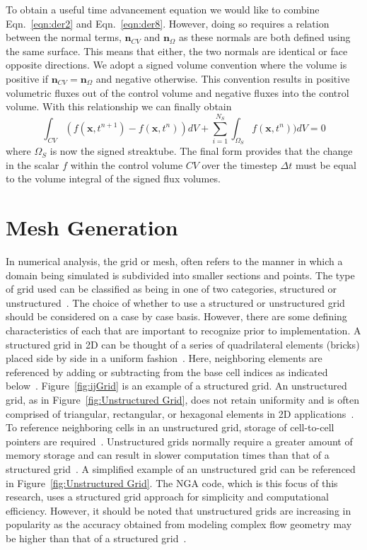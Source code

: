 To obtain a useful time advancement equation we would like to combine Eqn.~\ref{eqn:der2} and Eqn.~\ref{eqn:der8}. However, doing so requires a relation between the normal terms, $\bm{n}_{CV}$ and $\bm{n}_{\Omega}$ as these normals are both defined using the same surface. This means that either, the two normals are identical or face opposite directions. We adopt a signed volume convention where the volume is positive if $\bm{n}_{CV} = \bm{n}_{\Omega}$ and negative otherwise. This convention results in positive volumetric fluxes out of the control volume and negative fluxes into the control volume. With this relationship we can finally obtain 
\begin{equation}
\int_{CV} (f (\bm{x} , t^{n+1}) - f (\bm{x} , t^{n}) )dV + \sum_{i=1}^{N_S}\int_{\Omega_S} f (\bm{x} , t^{n}) )dV =0
\label{eqn:derFinal}
\end{equation}
where $\Omega_S$ is now the signed streaktube. The final form provides that the change in the scalar $f$  within the control volume $CV$ over the timestep $\Delta t$ must be equal to the volume integral of the signed flux volumes. 

\section{Mesh Generation}
In numerical analysis, the grid or mesh, often refers to the manner in which a domain being simulated is subdivided into smaller sections and points. The type of grid used can be classified as being in one of two categories, structured or unstructured~\cite{anderson}. The choice of whether to use a structured or unstructured grid should be considered on a case by case basis. However, there are some defining characteristics of each that are important to recognize prior to implementation. A structured grid in 2D can be thought of a series of quadrilateral elements (bricks) placed side by side in a uniform fashion~\cite{MIT}. Here, neighboring elements are referenced by adding or subtracting from the base cell indices as indicated below~\cite{anderson}. Figure~\ref{fig:ijGrid} is an example of a structured grid. An unstructured grid, as in Figure~\ref{fig:Unstructured Grid}, does not retain uniformity and is often comprised of triangular, rectangular, or hexagonal elements in 2D applications~\cite{tu}. To reference neighboring cells in an unstructured grid, storage of cell-to-cell pointers are required~\cite{MIT}. Unstructured grids normally require a greater amount of memory storage and can result in slower computation times than that of a structured grid~\cite{magoules}. A simplified example of an unstructured grid can be referenced in Figure~\ref{fig:Unstructured Grid}. The NGA code, which is this focus of this research, uses a structured grid approach for simplicity and computational efficiency. However, it should be noted that unstructured grids are increasing in popularity as the accuracy obtained from modeling complex flow geometry may be higher than that of a structured grid~\cite{Hirt1981}. 

